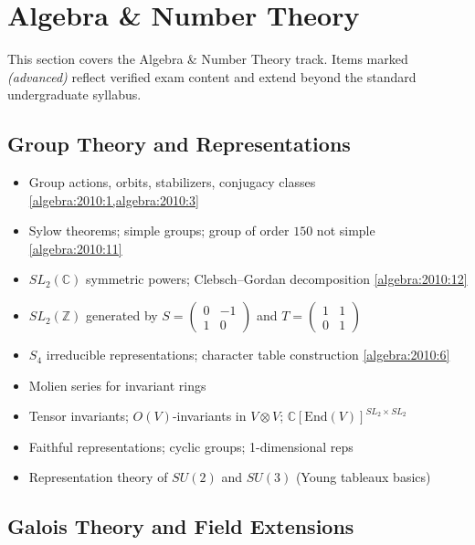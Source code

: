 \section{Algebra \& Number Theory}
\label{sec:prep-algebra}

This section covers the Algebra \& Number Theory track. Items marked \textit{(advanced)} reflect verified exam content and extend beyond the standard undergraduate syllabus.

\subsection{Group Theory and Representations}

\begin{itemize}
  \item Group actions, orbits, stabilizers, conjugacy classes \hfill \cref{algebra:2010:1,algebra:2010:3}
  \item Sylow theorems; simple groups; group of order $150$ not simple \hfill \cref{algebra:2010:11}
  \item $SL_2(\mathbb{C})$ symmetric powers; Clebsch--Gordan decomposition \hfill \cref{algebra:2010:12}
  \item $SL_2(\mathbb{Z})$ generated by $S=\begin{pmatrix}0&-1\\1&0\end{pmatrix}$ and $T=\begin{pmatrix}1&1\\0&1\end{pmatrix}$
  \item $S_4$ irreducible representations; character table construction \hfill \cref{algebra:2010:6}
  \item Molien series for invariant rings
  \item Tensor invariants; $O(V)$-invariants in $V\otimes V$; $\mathbb{C}[\mathrm{End}(V)]^{SL_2\times SL_2}$
  \item Faithful representations; cyclic groups; 1-dimensional reps
  \item Representation theory of $SU(2)$ and $SU(3)$ (Young tableaux basics)
\end{itemize}

\subsection{Galois Theory and Field Extensions}

